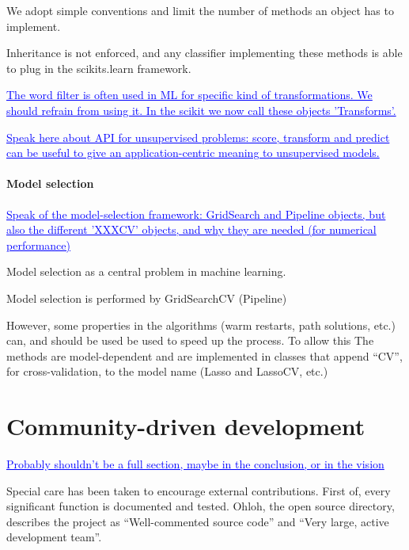 \documentclass[twoside,11pt]{article}
\newcommand{\GAEL}[1]{\textcolor{blue}{\uline{#1}}}
\begin{document}
We adopt simple conventions and limit the number of methods an object
has to implement. 

Inheritance is not
enforced, and any classifier implementing these methods is able to
plug in the scikits.learn framework.



\GAEL{The word filter is often used in ML for specific kind of
transformations. We should refrain from using it. In the scikit we now
call these objects 'Transforms'. }

\GAEL{Speak here about API for unsupervised problems: score, transform and
predict can be useful to give an application-centric meaning to
unsupervised models.}

\paragraph{Model selection}

\GAEL{Speak of the model-selection framework: GridSearch and Pipeline
objects, but also the different 'XXXCV' objects, and why they are needed
(for numerical performance)}

Model selection as a central problem in machine learning.

Model selection is performed by GridSearchCV (Pipeline)

However, some properties in the algorithms (warm restarts, path
solutions, etc.) can, and should be used be used to speed up the
process. To allow this The methods are model-dependent and are
implemented in classes that append ``CV'', for cross-validation, to
the model name (Lasso and LassoCV, etc.)


\section{Community-driven development}

\GAEL{Probably shouldn't be a full section, maybe in the conclusion, or
in the vision}

Special care has been taken to encourage external contributions. First
of, every significant function is documented and tested.  Ohloh, the
open source directory, describes the project as ``Well-commented
source code'' and ``Very large, active development team''.
\end{document}
